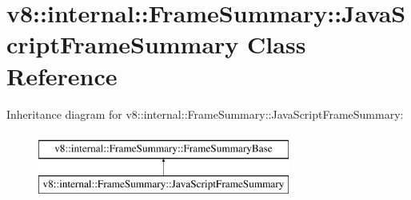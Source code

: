 \hypertarget{classv8_1_1internal_1_1FrameSummary_1_1JavaScriptFrameSummary}{}\section{v8\+:\+:internal\+:\+:Frame\+Summary\+:\+:Java\+Script\+Frame\+Summary Class Reference}
\label{classv8_1_1internal_1_1FrameSummary_1_1JavaScriptFrameSummary}
Inheritance diagram for v8\+:\+:internal\+:\+:Frame\+Summary\+:\+:Java\+Script\+Frame\+Summary\+:\begin{figure}[H]
\begin{center}
\leavevmode
\includegraphics[height=2.000000cm]{classv8_1_1internal_1_1FrameSummary_1_1JavaScriptFrameSummary}
\end{center}
\end{figure}
